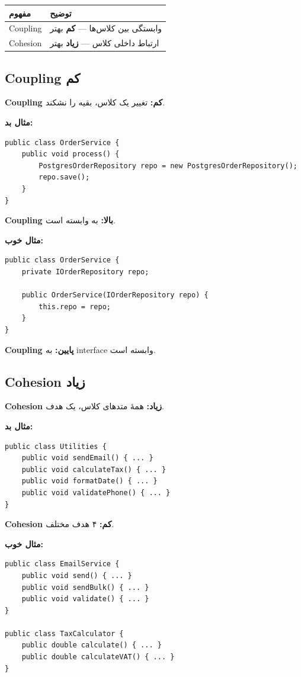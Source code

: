 \documentclass[12pt, a4paper]{article}
\begin{document}
\begin{center}
\begin{tabular}{|l|p{9cm}|}
\hline
\textbf{مفهوم} & \textbf{توضیح} \\
\hline
Coupling & وابستگی بین کلاس‌ها — \textbf{کم} بهتر \\
\hline
Cohesion & ارتباط داخلی کلاس — \textbf{زیاد} بهتر \\
\hline
\end{tabular}
\end{center}

\subsection{Coupling کم}

\textbf{Coupling کم:} تغییر یک کلاس، بقیه را نشکند.

\textbf{مثال بد:}
\begin{lstlisting}
public class OrderService {
    public void process() {
        PostgresOrderRepository repo = new PostgresOrderRepository();
        repo.save();
    }
}
\end{lstlisting}

\textbf{Coupling بالا:}  به  
وابسته است.

\textbf{مثال خوب:}
\begin{lstlisting}
public class OrderService {
    private IOrderRepository repo;
    
    public OrderService(IOrderRepository repo) {
        this.repo = repo;
    }
}
\end{lstlisting}

\textbf{Coupling پایین:}  به interface وابسته است.

\subsection{Cohesion زیاد}

\textbf{Cohesion زیاد:} همهٔ متدهای کلاس، یک هدف.

\textbf{مثال بد:}
\begin{lstlisting}
public class Utilities {
    public void sendEmail() { ... }
    public void calculateTax() { ... }
    public void formatDate() { ... }
    public void validatePhone() { ... }
}
\end{lstlisting}

\textbf{Cohesion کم:} ۴ هدف مختلف.

\textbf{مثال خوب:}
\begin{lstlisting}
public class EmailService {
    public void send() { ... }
    public void sendBulk() { ... }
    public void validate() { ... }
}

public class TaxCalculator {
    public double calculate() { ... }
    public double calculateVAT() { ... }
}
\end{lstlisting}
\end{document}
